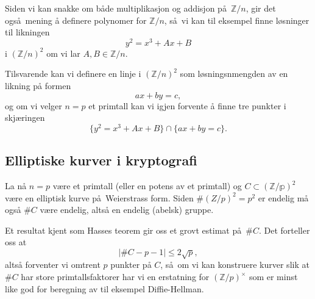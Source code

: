 Siden vi kan snakke om både multiplikasjon og addisjon på $\mathbb Z / n$,
gir det også mening å definere polynomer for $\mathbb Z / n$,
så vi kan til eksempel finne løsninger til likningen
\[
    y^2 = x^3 + Ax + B
\]
i ${(\mathbb Z / n)}^2$ om vi lar $A, B\in \mathbb Z / n$.

Tilsvarende kan vi definere en linje i ${(\mathbb Z / n)}^2$
som løsningsnmengden av en likning på formen
\[
    ax + by = c,
\]
og om vi velger $n = p$ et primtall kan vi igjen forvente å finne
tre punkter i skjæringen
\[
    \{y^2 = x^3 + Ax + B\}\cap \{ax + by = c\}.
\]

\subsection{Elliptiske kurver i kryptografi}
La nå $n = p$ være et primtall (eller en potens av et primtall)
og $C\subset \mathbb {(Z / p)}^2$
være en elliptisk kurve på Weierstrass form.
Siden $\#{(Z / p)}^2 = p^2$ er endelig må også $\#C$ være endelig,
altså en endelig (abelsk) gruppe.

Et resultat kjent som Hasses teorem \cite[Thm.~V.1.1]{silverman_arithmetic_2009}
gir oss et grovt estimat på $\#C$.
Det forteller oss at
\[
    \left|
        \# C - p - 1
    \right| \leq 2 \sqrt p,
\]
altså forventer vi omtrent $p$ punkter på $C$,
så om vi kan konstruere kurver slik at $\#C$
har store primtallsfaktorer har vi en erstatning
for ${(\mathbb Z / p)}^\times$ som er minst like god for beregning av
til eksempel Diffie-Hellman.

